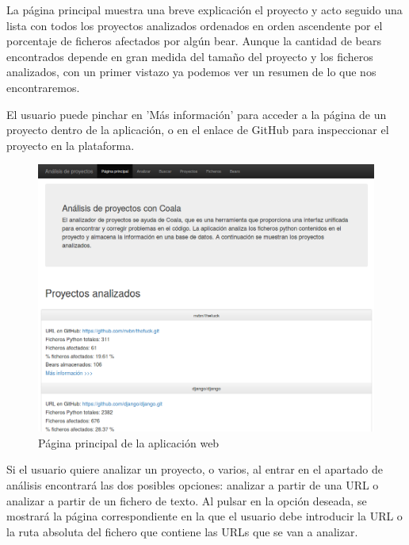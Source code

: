 \documentclass[a4paper, 12pt]{book}
\begin{document}
La página principal muestra una breve explicación el proyecto y acto seguido una lista con todos los proyectos analizados ordenados en orden ascendente por el porcentaje de ficheros afectados por algún bear. Aunque la cantidad de bears encontrados depende en gran medida del tamaño del proyecto y los ficheros analizados, con un primer vistazo ya podemos ver un resumen de lo que nos encontraremos.

El usuario puede pinchar en 'Más información' para acceder a la página de un proyecto dentro de la aplicación, o en el enlace de GitHub para inspeccionar el proyecto en la plataforma.

\begin{figure}[h]
  \centering
  \includegraphics[width=12cm, keepaspectratio]{img/homePage}
  \caption{Página principal de la aplicación web}
  \label{fig:homePage}
\end{figure}

Si el usuario quiere analizar un proyecto, o varios, al entrar en el apartado de análisis encontrará las dos posibles opciones: analizar a partir de una URL o analizar a partir de un fichero de texto. Al pulsar en la opción deseada, se mostrará la página correspondiente en la que el usuario debe introducir la URL o la ruta absoluta del fichero que contiene las URLs que se van a analizar.
\end{document}
